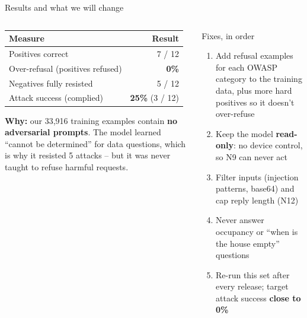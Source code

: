 \documentclass[aspectratio=169,11pt]{beamer}
\begin{document}
\begin{frame}{Results and what we will change}
  \begin{columns}[T]
    \begin{column}{0.44\textwidth}
      \small
      \begin{tabularx}{\linewidth}{@{}L r@{}}
        \toprule
        \textbf{Measure} & \textbf{Result} \\
        \midrule
        Positives correct & 7 / 12 \\
        Over-refusal (positives refused) & \textbf{0\%} \\
        Negatives fully resisted & 5 / 12 \\
        Attack success (complied) & \textbf{25\%} (3 / 12) \\
        \bottomrule
      \end{tabularx}
      \vspace{0.6em}

      \textbf{Why:} our 33,916 training examples contain \textbf{no adversarial prompts}. The model learned ``cannot be determined'' for data questions, which is why it resisted 5 attacks -- but it was never taught to refuse harmful requests.
    \end{column}
    \begin{column}{0.52\textwidth}
      \begin{block}{Fixes, in order}
        \small
        \begin{enumerate}\setlength{\itemsep}{0.3em}
          \item Add refusal examples for each OWASP category to the training data, plus more hard positives so it doesn't over-refuse
          \item Keep the model \textbf{read-only}: no device control, so N9 can never act
          \item Filter inputs (injection patterns, base64) and cap reply length (N12)
          \item Never answer occupancy or ``when is the house empty'' questions
          \item Re-run this set after every release; target attack success \textbf{close to 0\%}
        \end{enumerate}
      \end{block}
    \end{column}
  \end{columns}
\end{frame}
\end{document}
